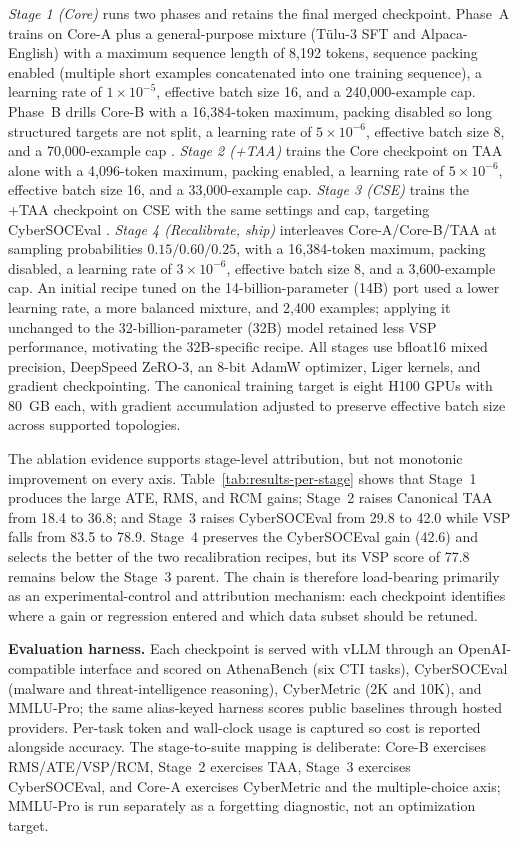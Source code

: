 \documentclass[conference]{IEEEtran}
\begin{document}
\emph{Stage 1 (Core)} runs two phases and retains the final merged checkpoint. Phase~A trains on Core-A plus a general-purpose mixture (Tülu-3 SFT and Alpaca-English) with a maximum sequence length of 8,192 tokens, sequence packing enabled (multiple short examples concatenated into one training sequence), a learning rate of $1\times10^{-5}$, effective batch size 16, and a 240,000-example cap. Phase~B drills Core-B with a 16,384-token maximum, packing disabled so long structured targets are not split, a learning rate of $5\times10^{-6}$, effective batch size 8, and a 70,000-example cap \cite{alam2025athenabench,chung2022flant5,gururangan2020dontstop}. \emph{Stage 2 (+TAA)} trains the Core checkpoint on TAA alone with a 4,096-token maximum, packing enabled, a learning rate of $5\times10^{-6}$, effective batch size 16, and a 33,000-example cap. \emph{Stage 3 (CSE)} trains the +TAA checkpoint on CSE with the same settings and cap, targeting CyberSOCEval \cite{cybersoceval2025}. \emph{Stage 4 (Recalibrate, ship)} interleaves Core-A/Core-B/TAA at sampling probabilities $0.15/0.60/0.25$, with a 16,384-token maximum, packing disabled, a learning rate of $3\times10^{-6}$, effective batch size 8, and a 3,600-example cap. An initial recipe tuned on the 14-billion-parameter (14B) port used a lower learning rate, a more balanced mixture, and 2,400 examples; applying it unchanged to the 32-billion-parameter (32B) model retained less VSP performance, motivating the 32B-specific recipe. All stages use bfloat16 mixed precision, DeepSpeed ZeRO-3, an 8-bit AdamW optimizer, Liger kernels, and gradient checkpointing. The canonical training target is eight H100 GPUs with 80~GB each, with gradient accumulation adjusted to preserve effective batch size across supported topologies.

The ablation evidence supports stage-level attribution, but not monotonic improvement on every axis. Table~\ref{tab:results-per-stage} shows that Stage~1 produces the large ATE, RMS, and RCM gains; Stage~2 raises Canonical TAA from 18.4 to 36.8; and Stage~3 raises CyberSOCEval from 29.8 to 42.0 while VSP falls from 83.5 to 78.9. Stage~4 preserves the CyberSOCEval gain (42.6) and selects the better of the two recalibration recipes, but its VSP score of 77.8 remains below the Stage~3 parent. The chain is therefore load-bearing primarily as an experimental-control and attribution mechanism: each checkpoint identifies where a gain or regression entered and which data subset should be retuned.

\textbf{Evaluation harness.} Each checkpoint is served with vLLM through an OpenAI-compatible interface \cite{kwon2023vllm} and scored on AthenaBench (six CTI tasks), CyberSOCEval (malware and threat-intelligence reasoning), CyberMetric (2K and 10K), and MMLU-Pro; the same alias-keyed harness scores public baselines through hosted providers. Per-task token and wall-clock usage is captured so cost is reported alongside accuracy. The stage-to-suite mapping is deliberate: Core-B exercises RMS/ATE/VSP/RCM, Stage~2 exercises TAA, Stage~3 exercises CyberSOCEval, and Core-A exercises CyberMetric and the multiple-choice axis; MMLU-Pro is run separately as a forgetting diagnostic, not an optimization target.
\end{document}
